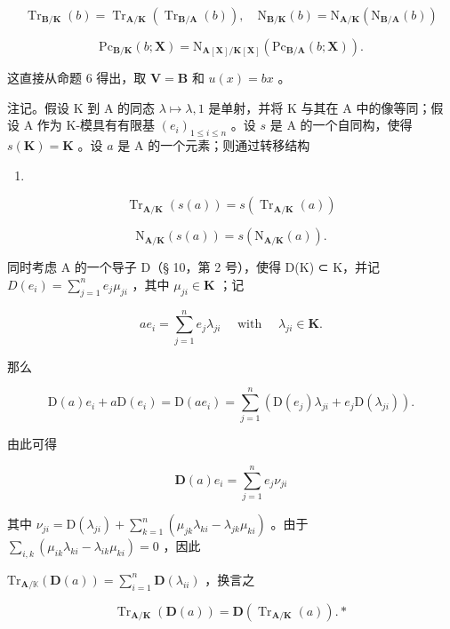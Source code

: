 \[
\operatorname{Tr} _ {\mathbf {B} / \mathbf {K}} (b) = \operatorname{Tr} _ {\mathbf {A} / \mathbf {K}} (\operatorname{Tr} _ {\mathbf {B} / \mathbf {A}} (b)), \quad \mathrm{N} _ {\mathbf {B} / \mathbf {K}} (b) = \mathrm{N} _ {\mathbf {A} / \mathbf {K}} (\mathrm{N} _ {\mathbf {B} / \mathbf {A}} (b))\tag{26}
\]

\[
\mathrm{Pc} _ {\mathbf {B} / \mathbf {K}} (b; \mathbf {X}) = \mathrm{N} _ {\mathbf {A} [ \mathbf {X} ] / \mathbf {K} [ \mathbf {X} ]} (\mathrm{Pc} _ {\mathbf {B} / \mathbf {A}} (b; \mathbf {X})).
\]

这直接从命题 6 得出，取 \(\mathbf{V} = \mathbf{B}\) 和 \(u(x) = bx\) 。

注记。假设 K 到 A 的同态 \(\lambda \mapsto \lambda, 1\) 是单射，并将 K 与其在 A 中的像等同；假设 A 作为 K-模具有有限基 \((e_i)_{1 \leqslant i \leqslant n}\) 。设 \(s\) 是 A 的一个自同构，使得 \(s(\mathbf{K}) = \mathbf{K}\) 。设 \(a\) 是 A 的一个元素；则通过转移结构

\begin{enumerate}
\def\labelenumi{(\arabic{enumi})}
\setcounter{enumi}{26}
\tightlist
\item
\end{enumerate}

\[
\operatorname{Tr} _ {\mathbf {A} / \mathbf {K}} (s (a)) = s (\operatorname{Tr} _ {\mathbf {A} / \mathbf {K}} (a))\tag{28}
\]

\[
\mathrm{N} _ {\mathbf {A} / \mathbf {K}} (s (a)) = s (\mathrm{N} _ {\mathbf {A} / \mathbf {K}} (a)).
\]

同时考虑 A 的一个导子 D（§ 10，第 2 号），使得 D(K) ⊂ K，并记 \(D (e _ {i}) = \sum_ {j = 1} ^ {n} e _ {j} \mu_ {j i}\) ，其中 \(\mu_ {j i} \in \mathbf {K}\) ；记

\[
a e _ {i} = \sum_ {j = 1} ^ {n} e _ {j} \lambda_ {j i} \quad \text { with } \quad \lambda_ {j i} \in \mathbf {K}.
\]

那么

\[
\mathrm{D} (a) e _ {i} + a \mathrm{D} (e _ {i}) = \mathrm{D} (a e _ {i}) = \sum_ {j = 1} ^ {n} (\mathrm{D} (e _ {j}) \lambda_ {j i} + e _ {j} \mathrm{D} (\lambda_ {j i})).
\]

由此可得

\[
\mathbf {D} (a) e _ {i} = \sum_ {j = 1} ^ {n} e _ {j} \nu_ {j i}
\]

其中 \(\nu_{ji} = \mathrm{D}(\lambda_{ji}) + \sum_{k=1}^{n} (\mu_{jk}\lambda_{ki} - \lambda_{jk}\mu_{ki})\) 。由于 \(\sum_{i,k} (\mu_{ik}\lambda_{ki} - \lambda_{ik}\mu_{ki}) = 0\) ，因此

 \(\mathrm{Tr}_{\mathbf{A} / \mathbb{K}}(\mathbf{D}(a)) = \sum_{i = 1}^{n}\mathbf{D}(\lambda_{ii})\) ，换言之

\[
\operatorname{Tr} _ {\mathbf {A} / \mathbf {K}} (\mathbf {D} (a)) = \mathbf {D} (\operatorname{Tr} _ {\mathbf {A} / \mathbf {K}} (a)). *\tag{29}
\]

